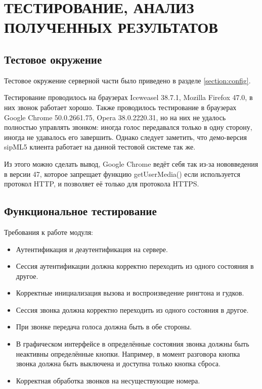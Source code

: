 \chapter{ТЕСТИРОВАНИЕ, АНАЛИЗ ПОЛУЧЕННЫХ РЕЗУЛЬТАТОВ}

\section{Тестовое окружение}

Тестовое окружение серверной части было приведено в разделе \ref{section:config}.

Тестирование проводилось на браузерах Iceweasel 38.7.1, Mozilla Firefox 47.0, в них звонок работает хорошо. Также проводилось тестирование в браузерах Google Chrome 50.0.2661.75, Opera 38.0.2220.31, но на них не удалось полностью управлять звонком: иногда голос передавался только в одну сторону, иногда не удавалось его завершить. Однако следует заметить, что демо-версия sipML5 клиента\cite{sipML5_demo} работает на данной тестовой системе так же.

Из этого можно сделать вывод, Google Chrome ведёт себя так из-за нововведения в версии 47, которое запрещает функцию getUserMedia() если используется протокол HTTP, и позволяет её только для протокола HTTPS.\cite{chrome_https}

\section{Функциональное тестирование}

Требования к работе модуля:
\begin{itemize}
\item Аутентификация и деаутентификация на сервере.
\item Сессия аутентификации должна корректно переходить из одного состояния в другое.
\item Корректные инициализация вызова и воспроизведение рингтона и гудков.
\item Сессия звонка должна корректно переходить из одного состояния в другое.
\item При звонке передача голоса должна быть в обе стороны.
\item В графическом интерфейсе в определённые состояния звонка должны быть неактивны определённые кнопки. Например, в момент разговора кнопка звонка должна быть выключена и доступна только кнопка сброса.
\item Корректная обработка звонков на несуществующие номера.
\end{itemize}

